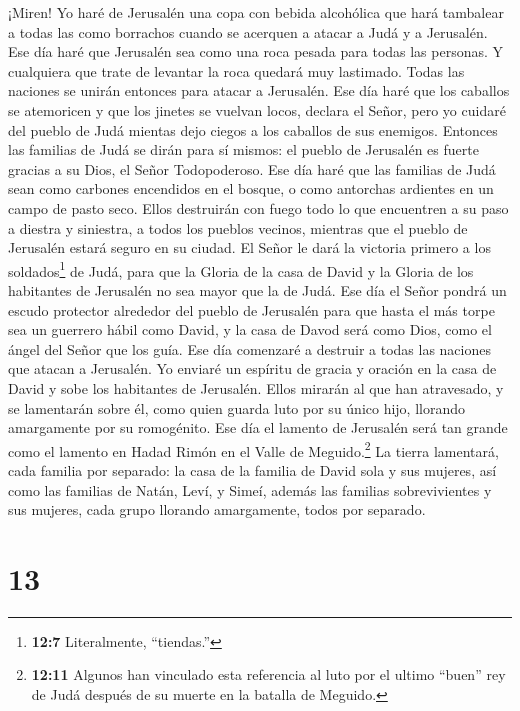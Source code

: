  ¡Miren! Yo haré de Jerusalén una copa con bebida alcohólica
que hará tambalear a todas las como borrachos cuando se acerquen a
atacar a Judá y a Jerusalén.  Ese día haré que Jerusalén sea
como una roca pesada para todas las personas. Y cualquiera que trate de
levantar la roca quedará muy lastimado. Todas las naciones se unirán
entonces para atacar a Jerusalén.  Ese día haré que los
caballos se atemoricen y que los jinetes se vuelvan locos, declara el
Señor, pero yo cuidaré del pueblo de Judá mientas dejo ciegos a los
caballos de sus enemigos.  Entonces las familias de Judá se
dirán para sí mismos: el pueblo de Jerusalén es fuerte gracias a su
Dios, el Señor Todopoderoso.  Ese día haré que las familias
de Judá sean como carbones encendidos en el bosque, o como antorchas
ardientes en un campo de pasto seco. Ellos destruirán con fuego todo lo
que encuentren a su paso a diestra y siniestra, a todos los pueblos
vecinos, mientras que el pueblo de Jerusalén estará seguro en su ciudad.
 El Señor le dará la victoria primero a los
soldados\footnote{\textbf{12:7} Literalmente, ``tiendas.''} de Judá,
para que la Gloria de la casa de David y la Gloria de los habitantes de
Jerusalén no sea mayor que la de Judá.  Ese día el Señor
pondrá un escudo protector alrededor del pueblo de Jerusalén para que
hasta el más torpe sea un guerrero hábil como David, y la casa de Davod
será como Dios, como el ángel del Señor que los guía.  Ese
día comenzaré a destruir a todas las naciones que atacan a Jerusalén.
 Yo enviaré un espíritu de gracia y oración en la casa de
David y sobe los habitantes de Jerusalén. Ellos mirarán al que han
atravesado, y se lamentarán sobre él, como quien guarda luto por su
único hijo, llorando amargamente por su romogénito.  Ese
día el lamento de Jerusalén será tan grande como el lamento en Hadad
Rimón en el Valle de Meguido.\footnote{\textbf{12:11} Algunos han
  vinculado esta referencia al luto por el ultimo ``buen'' rey de Judá
  después de su muerte en la batalla de Meguido.}  La
tierra lamentará, cada familia por separado: la casa de la familia de
David sola y sus mujeres, así como las familias de Natán, 
Leví, y Simeí,  además las familias sobrevivientes y sus
mujeres, cada grupo llorando amargamente, todos por separado.

\hypertarget{section-12}{%
\section{13}\label{section-12}}

